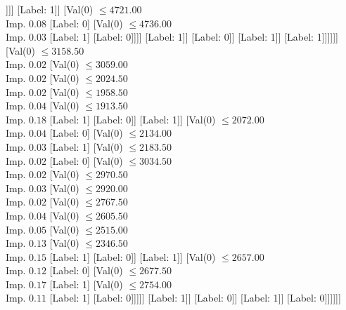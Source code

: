 \documentclass[margin=10pt]{standalone}
\begin{document}
\begin{forest}
																			[Label: 1]
																			[Label: 0]]]]
																[Label: 1]]
															[Val($0$) $ \leq 4721.00$ \\ Imp. $0.08$
																[Label: 0]
																[Val($0$) $ \leq 4736.00$ \\ Imp. $0.03$
																	[Label: 1]
																	[Label: 0]]]]
														[Label: 1]]
													[Label: 0]]
												[Label: 1]]
											[Label: 1]]]]]]
						[Val($0$) $ \leq 3158.50$ \\ Imp. $0.02$
							[Val($0$) $ \leq 3059.00$ \\ Imp. $0.02$
								[Val($0$) $ \leq 2024.50$ \\ Imp. $0.02$
									[Val($0$) $ \leq 1958.50$ \\ Imp. $0.04$
										[Val($0$) $ \leq 1913.50$ \\ Imp. $0.18$
											[Label: 1]
											[Label: 0]]
										[Label: 1]]
									[Val($0$) $ \leq 2072.00$ \\ Imp. $0.04$
										[Label: 0]
										[Val($0$) $ \leq 2134.00$ \\ Imp. $0.03$
											[Label: 1]
											[Val($0$) $ \leq 2183.50$ \\ Imp. $0.02$
												[Label: 0]
												[Val($0$) $ \leq 3034.50$ \\ Imp. $0.02$
													[Val($0$) $ \leq 2970.50$ \\ Imp. $0.03$
														[Val($0$) $ \leq 2920.00$ \\ Imp. $0.02$
															[Val($0$) $ \leq 2767.50$ \\ Imp. $0.04$
																[Val($0$) $ \leq 2605.50$ \\ Imp. $0.05$
																	[Val($0$) $ \leq 2515.00$ \\ Imp. $0.13$
																		[Val($0$) $ \leq 2346.50$ \\ Imp. $0.15$
																			[Label: 1]
																			[Label: 0]]
																		[Label: 1]]
																	[Val($0$) $ \leq 2657.00$ \\ Imp. $0.12$
																		[Label: 0]
																		[Val($0$) $ \leq 2677.50$ \\ Imp. $0.17$
																			[Label: 1]
																			[Val($0$) $ \leq 2754.00$ \\ Imp. $0.11$
																				[Label: 1]
																				[Label: 0]]]]]
																[Label: 1]]
															[Label: 0]]
														[Label: 1]]
													[Label: 0]]]]]]

\end{forest}
\end{document}
